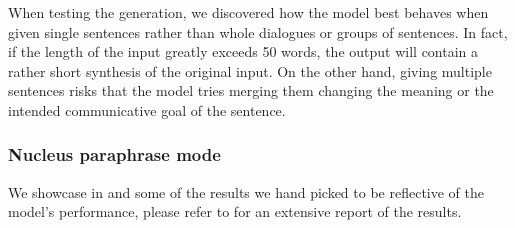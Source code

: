 \documentclass[nomenclature, english, biblatex]{kththesis}
\begin{document}
When testing the generation, we discovered how the model best behaves when given single sentences rather than whole dialogues or groups of sentences. In fact, if the length of the input greatly exceeds 50 words, the output will contain a rather short synthesis of the original input. On the other hand, giving multiple sentences risks that the model tries merging them changing the meaning or the intended communicative goal of the sentence.
\subsubsection{Nucleus paraphrase mode}
We showcase in  and  some of the results we hand picked to be reflective of the model's performance, please refer to  for an extensive report of the results.
\end{document}
